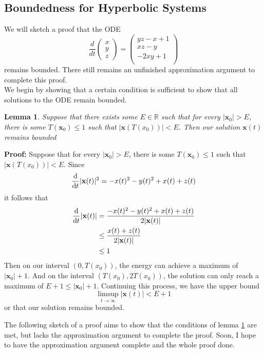 \documentclass[11pt]{article}
\newtheorem{lemma}{Lemma}
\newcommand{\R}{\mathbb{R}}
\begin{document}
\subsection{Boundedness for Hyperbolic Systems}
We will sketch a proof that the ODE
\begin{equation}\label{eq:last}
    \frac{d}{dt} \begin{pmatrix} x \\ y \\ z 
    \end{pmatrix} = \begin{pmatrix}
        yz - x + 1\\
        xz - y\\
        -2xy + 1\\
    \end{pmatrix} 
\end{equation} remains bounded. There still remains an unfinished approximation argument to complete this proof.\\

We begin by showing that a certain condition is sufficient to show that all solutions to the ODE remain bounded.

\begin{lemma}\label{lem:1}
    Suppose that there exists some $E \in \R$ such that for every $|\mathbf{x}_0| > E$, there is some $T(\mathbf{x}_0) \leq 1$ such that $|\mathbf{x}(T(x_0))| < E$. Then our solution $\mathbf{x}(t)$ remains bounded
\end{lemma}
\textbf{Proof: }Suppose that for every $|\mathbf{x}_0| > E$, there is some $T(\mathbf{x}_0) \leq 1$ such that $|\mathbf{x}(T(x_0))| < E$. Since $$\dv{}{t}|\mathbf{x}(t)|^2 = -x(t)^2 - y(t)^2 + x(t) + z(t)$$it follows that 
\begin{align*}
    \dv{}{t}|\mathbf{x}(t)| &= \frac{-x(t)^2 - y(t)^2 + x(t) + z(t)}{2|\mathbf{x}(t)|}\\
    &\leq \frac{x(t) + z(t)}{2|\mathbf{x}(t)|}\\
    & \leq 1
\end{align*}
Then on our interval $(0, T(x_0))$, the energy can achieve a maximum of $|\mathbf{x}_0| + 1$. And on the interval $(T(x_0), 2T(x_0))$, the solution can only reach a maximum of $E + 1 \leq |\mathbf{x}_0| + 1$. Continuing this process, we have the upper bound $$\underset{t \rightarrow \infty}{\limsup} |\mathbf{x}(t)| < E + 1$$or that our solution remains bounded. 

The following sketch of a proof aims to show that the conditions of lemma \ref{lem:1} are met, but lacks the approximation argument to complete the proof. Soon, I hope to have the approximation argument complete and the whole proof done. 
\end{document}
